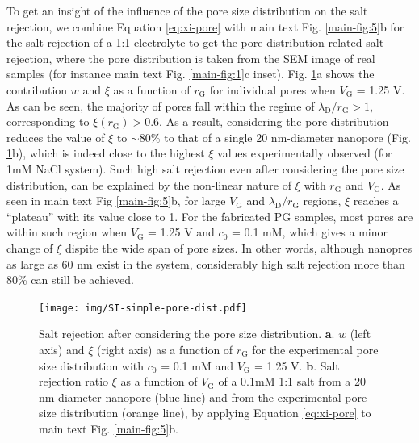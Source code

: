 \documentclass[manuscript=suppinfo,email=true, hyperref=true, keywords=false]{achemso}
\newcommand{\Fig}{Fig.}
\begin{document}
To get an insight of the influence of the pore size distribution on
the salt rejection, we combine Equation \ref{eq:xi-pore} with main
text \Fig{} \ref{main-fig:5}b for the salt rejection of a 1:1
electrolyte to get the pore-distribution-related salt rejection, where
the pore distribution is taken from the SEM image of real samples (for
instance main text \Fig{} \ref{main-fig:1}c inset). \Fig{}
\ref{fig:simple-rect-pore}a shows the contribution $w$ and $\xi$ as
a function of $r_{\mathrm{G}}$ for individual pores when
$V_{\mathrm{G}}$ = 1.25 V. As can be seen, the majority of pores fall
within the regime of $\lambda_{\mathrm{D}} / r_{\mathrm{G}} > 1$,
corresponding to $\xi(r_{\mathrm{G}}) > 0.6$. As a result, considering
the pore distribution reduces the value of $\xi$ to $\sim{}$80\% to
that of a single 20 nm-diameter nanopore (\Fig{}
\ref{fig:simple-rect-pore}b), which is indeed close to the highest
$\xi$ values experimentally observed (for 1mM NaCl system). Such high
salt rejection even after considering the pore size distribution, can
be explained by the non-linear nature of $\xi$ with $r_{\mathrm{G}}$
and $V_{\mathrm{G}}$. As seen in main text Fig{} \ref{main-fig:5}b,
for large $V_{\mathrm{G}}$ and $\lambda_{\mathrm{D}} / r_{\mathrm{G}}$
regions, $\xi$ reaches a ``plateau'' with its value close to 1. For
the fabricated PG samples, most pores are within such region when
$V_{\mathrm{G}}$ = 1.25 V and $c_{0}$ = 0.1 mM, which gives a minor
change of $\xi$ dispite the wide span of pore sizes. In other words,
although nanopres as large as 60 nm exist in the system, considerably
high salt rejection more than 80\% can still be achieved.

\begin{figure}[htbp]
  \centering
   \texttt{[image: img/SI-simple-pore-dist.pdf]}
   \caption{Salt rejection after considering the pore size
     distribution. \textbf{a}. $w$ (left axis) and $\xi$ (right axis)
     as a function of $r_{\mathrm{G}}$ for the experimental pore size
     distribution with $c_{0}$ = 0.1 mM and $V_{\mathrm{G}}$ = 1.25 V.
     \textbf{b}. Salt rejection ratio $\xi$ as a function of $V_{\mathrm{G}}$ of a
     0.1mM 1:1 salt from a 20 nm-diameter nanopore (blue line) and
     from the experimental pore size distribution (orange line), by
     applying Equation \ref{eq:xi-pore} to main text \Fig{}
     \ref{main-fig:5}b.}
  \label{fig:simple-rect-pore}
\end{figure}
\end{document}
